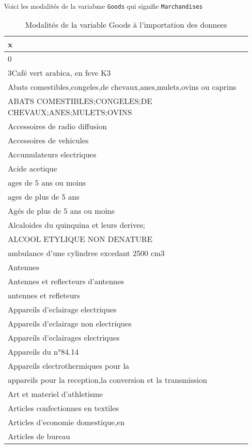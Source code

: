 \documentclass[
]{book}
\begin{document}
Voici les modalités de la variabme \texttt{Goods} qui signifie
\texttt{Marchandises}

\begin{table}

\caption{\label{tab:g}Modalités de la variable Goods à l'importation des donnees}
\centering
\begin{tabular}[t]{l}
\hline
x\\
\hline
0\\
\hline
3Café vert arabica, en feve K3\\
\hline
Abats comestibles,congeles,de chevaux,anes,mulets,ovins ou caprins\\
\hline
ABATS COMESTIBLES;CONGELES;DE CHEVAUX;ANES;MULETS;OVINS\\
\hline
Accessoires de radio diffusion\\
\hline
Accessoires de vehicules\\
\hline
Accumulateurs electriques\\
\hline
Acide acetique\\
\hline
ages de 5 ans ou moins\\
\hline
ages de plus de 5 ans\\
\hline
Agés de plus de 5 ans ou moins\\
\hline
Alcaloides du quinquina et leurs derives;\\
\hline
ALCOOL ETYLIQUE NON DENATURE\\
\hline
ambulance d'une cylindree excedant 2500 cm3\\
\hline
Antennes\\
\hline
Antennes et reflecteurs d'antennes\\
\hline
antennes et refleteurs\\
\hline
Appareils d'eclairage electriques\\
\hline
Appareils d'eclairage non electriques\\
\hline
Appareils d'eclairages electriques\\
\hline
Appareils du n°84.14\\
\hline
Appareils electrothermiques pour la\\
\hline
appareils pour la reception,la conversion et la transmission\\
\hline
Art et materiel d'athletisme\\
\hline
Articles confectionnes en textiles\\
\hline
Articles d'economie domestique,en\\
\hline
Articles de bureau\\

\end{tabular}
\end{table}
\end{document}
